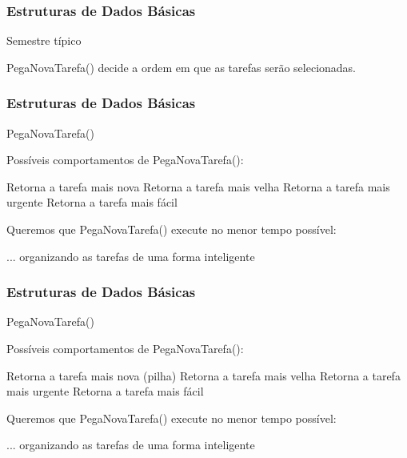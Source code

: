 

\begin{frame}
\frametitle{Estruturas de Dados Básicas}
\begin{block}{Semestre típico}
\lstI
\end{block}

\begin{block}{}
	\begin{itemize}
		\bitem PegaNovaTarefa() decide a ordem em que as tarefas serão selecionadas.
	\end{itemize}
\end{block}

\end{frame}

\begin{frame}
\frametitle{Estruturas de Dados Básicas}
\begin{block}{PegaNovaTarefa()}
\begin{itemize}
	\bitem Possíveis comportamentos de PegaNovaTarefa():
	\begin{itemize}
		\bitem Retorna a tarefa mais nova
		\bitem Retorna a tarefa mais velha
		\bitem Retorna a tarefa mais urgente
		\bitem Retorna a tarefa mais fácil
	\end{itemize}
	\bitem Queremos que PegaNovaTarefa() execute no menor tempo possível:
	\begin{itemize}
		\bitem ... organizando as tarefas de uma forma inteligente
	\end{itemize}
\end{itemize}
\end{block}
\end{frame}

\begin{frame}
\frametitle{Estruturas de Dados Básicas}
\begin{block}{PegaNovaTarefa()}
\begin{itemize}
	\bitem Possíveis comportamentos de PegaNovaTarefa():
	\begin{itemize}
		\bitem Retorna a tarefa mais nova (pilha)
		\bitem Retorna a tarefa mais velha
		\bitem Retorna a tarefa mais urgente
		\bitem Retorna a tarefa mais fácil
	\end{itemize}
	\bitem Queremos que PegaNovaTarefa() execute no menor tempo possível:
	\begin{itemize}
		\bitem ... organizando as tarefas de uma forma inteligente
	\end{itemize}
\end{itemize}
\end{block}
\end{frame}

